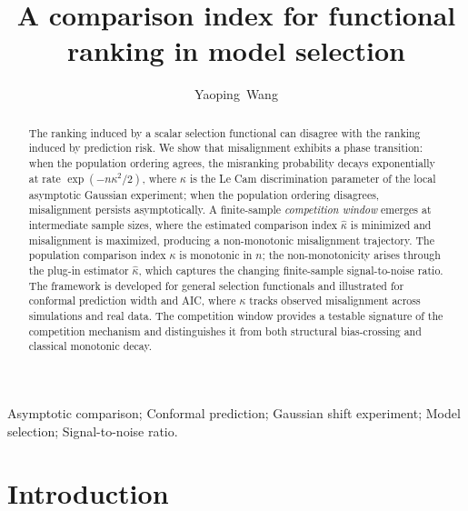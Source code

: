 \documentclass[lineno]{biometrika}
\begin{document}


\title{A comparison index for functional ranking in model selection}

\author{Yaoping~Wang}

\maketitle

\begin{abstract}
The ranking induced by a scalar selection functional can disagree with the ranking induced by prediction risk. We show that misalignment exhibits a phase transition: when the population ordering agrees, the misranking probability decays exponentially at rate $\exp(-n\kappa^2/2)$, where $\kappa$ is the Le Cam discrimination parameter of the local asymptotic Gaussian experiment; when the population ordering disagrees, misalignment persists asymptotically. A finite-sample \textit{competition window} emerges at intermediate sample sizes, where the estimated comparison index $\hat\kappa$ is minimized and misalignment is maximized, producing a non-monotonic misalignment trajectory. The population comparison index $\kappa$ is monotonic in $n$; the non-monotonicity arises through the plug-in estimator $\hat\kappa$, which captures the changing finite-sample signal-to-noise ratio. The framework is developed for general selection functionals and illustrated for conformal prediction width and AIC, where $\kappa$ tracks observed misalignment across simulations and real data. The competition window provides a testable signature of the competition mechanism and distinguishes it from both structural bias-crossing and classical monotonic decay.
\end{abstract}

\begin{keywords}
Asymptotic comparison; Conformal prediction; Gaussian shift experiment; Model selection; Signal-to-noise ratio.
\end{keywords}

\section{Introduction}
\end{document}
